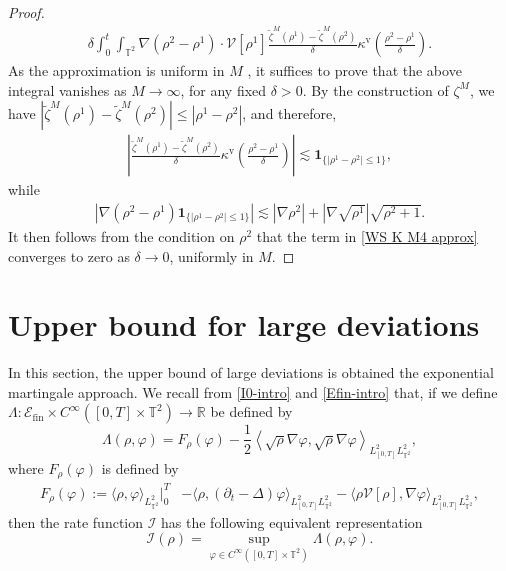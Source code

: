 \begin{proof}
\begin{align}\label{WS K M4 approx}
\delta\int^t_0\int_{\mathbb{T}^2} \nabla(\rho^2 - \rho^1) \cdot \mathcal{V}[\rho^1] \frac{\tilde{\zeta}^M(\rho^1) -\tilde{\zeta}^M(\rho^2)}{\delta} \kappa^{\mathrm{v}}\left(\frac{\rho^2 - \rho^1}{\delta}\right).
\end{align}
As the approximation is uniform in $M$ , it suffices to prove that the above integral vanishes as $M \to \infty$, for any fixed $\delta > 0$. By the construction of $\zeta^M$, we have $|\tilde{\zeta}^M(\rho^1) -\tilde{\zeta}^M(\rho^2)| \leq |\rho^1 - \rho^2|$, and therefore, 
\begin{align*}
\left|\frac{\tilde{\zeta}^M(\rho^1) -\tilde{\zeta}^M(\rho^2)}{\delta} \kappa^{\mathrm{v}}\left(\frac{\rho^2 - \rho^1}{\delta}\right)\right| \lesssim \mathbf{1}_{\{|\rho^1 - \rho^2| \leq 1\}},
\end{align*}
while 
\begin{align*}
\left|\nabla(\rho^2 - \rho^1)\mathbf{1}_{\{|\rho^1 - \rho^2| \leq 1\}}\right| \lesssim |\nabla\rho^2| +  |\nabla\sqrt{\rho^1}|\sqrt{\rho^2 + 1}.
\end{align*}
It then follows from the condition on $\rho^2$ that the term in \eqref{WS K M4 approx} converges to zero as $\delta \to 0$, uniformly in $M$. 
\end{proof}

\section{Upper bound for large deviations}\label{sec:LDP-UB} In this section, the upper bound of large deviations is obtained the exponential martingale approach. We recall from \eqref{I0-intro} and \eqref{Efin-intro} that, if we define $\Lambda:\mathcal{E}_{\mathrm{fin}}\times C^{\infty}([0,T]\times\mathbb{T}^2)\rightarrow \mathbb{R}$ be defined by
\begin{equation}\label{Lambda}
\Lambda(\rho,\varphi)=F_{\rho}(\varphi)-\frac{1}{2} \left\langle \sqrt{\rho}\nabla \varphi,\sqrt{\rho}\nabla\varphi\right\rangle_{L_{[0,T]}^2L^2_{\mathbb{T}^2}},
\end{equation}
where $F_{\rho}(\varphi)$ is defined by 
\begin{align}\label{F}
F_{\rho}(\varphi) := \langle \rho,\varphi \rangle_{L^2_{\mathbb{T}^2}}\Big|^T_0 & - \langle \rho,(\partial_t - \Delta)\varphi\rangle_{L_{[0,T]}^2L^2_{\mathbb{T}^2}} - \langle\rho \mathcal{V}[\rho],\nabla\varphi\rangle_{L_{[0,T]}^2L^2_{\mathbb{T}^2}},
\end{align}
then the rate function $\mathcal{I}$ has the following equivalent representation
\begin{equation}
\mathcal{I}(\rho)=\sup_{\varphi\in C^{\infty}([0,T]\times\mathbb{T}^2)}\Lambda(\rho,\varphi).
\end{equation}

